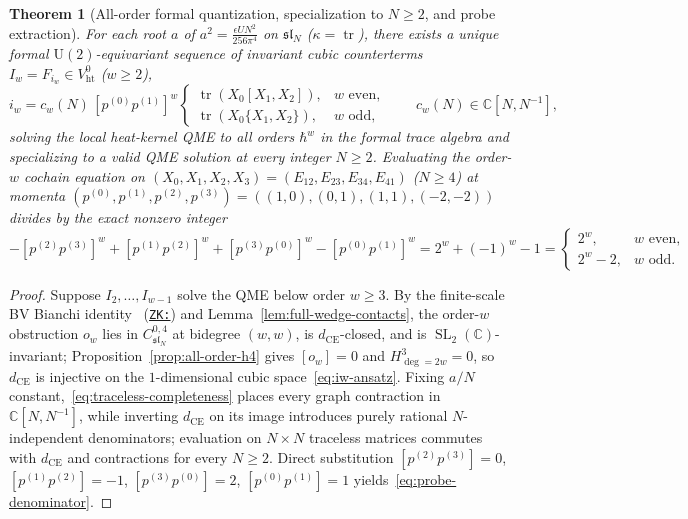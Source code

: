 \documentclass[11pt,letterpaper]{article}
\numberwithin{equation}{section}
\theoremstyle{plain}
\newtheorem{theorem}{Theorem}[section]
\theoremstyle{definition}
\theoremstyle{remark}
\newcommand{\fsl}{\mathfrak{sl}}
\newcommand{\tr}{\operatorname{tr}}
\newcommand{\SL}{\operatorname{SL}}
\newcommand{\Vht}{V_{\mathrm{ht}}}
\newcommand{\zkcard}[1]{\href{http://127.0.0.1:9124/?stack=#1}{\texttt{ZK:\detokenize{#1}}}}
\begin{document}
\begin{theorem}[All-order formal quantization, specialization to $N \ge 2$, and probe extraction]
\label{thm:all-orders-traceless}
For each root $a$ of $a^2 = \frac{\epsilon U N^2}{256\pi^4}$ on $\fsl_N$ ($\kappa = \tr$), there exists a unique formal $\mathrm{U}(2)$-equivariant sequence of invariant cubic counterterms $I_w = F_{i_w} \in \Vht^0$ ($w \ge 2$),
\begin{equation}
\label{eq:iw-ansatz}
i_w = c_w(N)\,[p^{(0)}p^{(1)}]^w \begin{cases} \tr(X_0[X_1,X_2]), & w\text{ even},\\ \tr(X_0\{X_1,X_2\}), & w\text{ odd}, \end{cases} \qquad c_w(N) \in \mathbb{C}[N, N^{-1}],
\end{equation}
solving the local heat-kernel QME to all orders $\hbar^w$ in the formal trace algebra and specializing to a valid QME solution at every integer $N \ge 2$. Evaluating the order-$w$ cochain equation on $(X_0,X_1,X_2,X_3) = (E_{12}, E_{23}, E_{34}, E_{41})$ ($N \ge 4$) at momenta $(p^{(0)},p^{(1)},p^{(2)},p^{(3)}) = ((1,0),(0,1),(1,1),(-2,-2))$ divides by the exact nonzero integer
\begin{equation}
\label{eq:probe-denominator}
-[p^{(2)}p^{(3)}]^w + [p^{(1)}p^{(2)}]^w + [p^{(3)}p^{(0)}]^w - [p^{(0)}p^{(1)}]^w = 2^w + (-1)^w - 1 = \begin{cases} 2^w, & w\text{ even},\\ 2^w - 2, & w\text{ odd}. \end{cases}
\end{equation}
\end{theorem}

\begin{proof}
Suppose $I_2,\dots,I_{w-1}$ solve the QME below order $w \ge 3$. By the finite-scale BV Bianchi identity~\cite{CostelloBV,WW} (\zkcard{costello-counterterms-qme-tower}) and Lemma~\ref{lem:full-wedge-contacts}, the order-$w$ obstruction $o_w$ lies in $C^{0,4}_{\fsl_N}$ at bidegree $(w,w)$, is $d_{\mathrm{CE}}$-closed, and is $\SL_2(\mathbb{C})$-invariant; Proposition~\ref{prop:all-order-h4} gives $[o_w] = 0$ and $H^3_{\deg=2w} = 0$, so $d_{\mathrm{CE}}$ is injective on the $1$-dimensional cubic space~\eqref{eq:iw-ansatz}. Fixing $a/N$ constant,~\eqref{eq:traceless-completeness} places every graph contraction in $\mathbb{C}[N,N^{-1}]$, while inverting $d_{\mathrm{CE}}$ on its image introduces purely rational $N$-independent denominators; evaluation on $N\times N$ traceless matrices commutes with $d_{\mathrm{CE}}$ and contractions for every $N \ge 2$. Direct substitution $[p^{(2)}p^{(3)}] = 0$, $[p^{(1)}p^{(2)}] = -1$, $[p^{(3)}p^{(0)}] = 2$, $[p^{(0)}p^{(1)}] = 1$ yields~\eqref{eq:probe-denominator}.
\end{proof}
\end{document}
